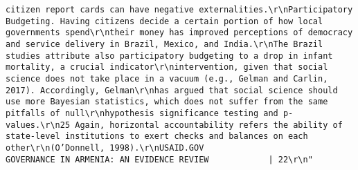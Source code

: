 \documentclass[
]{article}
\begin{document}
\begin{verbatim}
citizen report cards can have negative externalities.\r\nParticipatory Budgeting. Having citizens decide a certain portion of how local governments spend\r\ntheir money has improved perceptions of democracy and service delivery in Brazil, Mexico, and India.\r\nThe Brazil studies attribute also participatory budgeting to a drop in infant mortality, a crucial indicator\r\nintervention, given that social science does not take place in a vacuum (e.g., Gelman and Carlin, 2017). Accordingly, Gelman\r\nhas argued that social science should use more Bayesian statistics, which does not suffer from the same pitfalls of null\r\nhypothesis significance testing and p-values.\r\n25 Again, horizontal accountability refers the ability of state-level institutions to exert checks and balances on each other\r\n(O’Donnell, 1998).\r\nUSAID.GOV                                                                GOVERNANCE IN ARMENIA: AN EVIDENCE REVIEW            | 22\r\n"                                                                                                                                                                                                                                                                                                                                                                                                                                                                                                                                                                                                                                                                                                                                                                                      

\end{verbatim}
\end{document}
